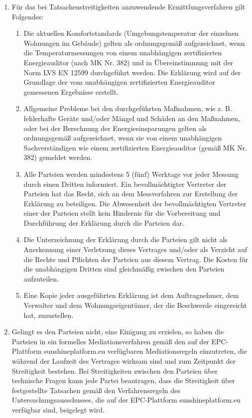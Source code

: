 \begin{multicols}{2}
\begin{enumerate}
   \item Für das bei Tatsachenstreitigkeiten anzuwendende Ermittlungsverfahren gilt Folgendes:
   \begin{enumerate}
   \item Die aktuellen Komfortstandards (Umgebungstemperatur der einzelnen Wohnungen im Gebäude) gelten als ordnungsgemäß aufgezeichnet, wenn die Temperaturmessungen von einem unabhängigen zertifizierten Energieauditor (nach MK Nr. 382) und in Übereinstimmung mit der Norm LVS EN 12599 durchgeführt werden. Die Erklärung wird auf der Grundlage der vom unabhängigen zertifizierten Energieauditor gemessenen Ergebnisse erstellt.
   \item Allgemeine Probleme bei den durchgeführten Maßnahmen, wie z. B. fehlerhafte Geräte und/oder Mängel und Schäden an den Maßnahmen, oder bei der Berechnung der Energieeinsparungen gelten als ordnungsgemäß aufgezeichnet, wenn sie von einem unabhängigen Sachverständigen wie einem zertifizierten Energieauditor (gemäß MK Nr. 382) gemeldet werden.
   \item Alle Parteien werden mindestens 5 (fünf) Werktage vor jeder Messung durch einen Dritten informiert. Ein bevollmächtigter Vertreter der Parteien hat das Recht, sich an dem Messverfahren zur Erstellung der Erklärung zu beteiligen. Die Abwesenheit der bevollmächtigten Vertreter einer der Parteien stellt kein Hindernis für die Vorbereitung und Durchführung der Erklärung durch die Parteien dar.
   \item Die Unterzeichnung der Erklärung durch die Parteien gilt nicht als Anerkennung einer Verletzung dieses Vertrages und/oder als Verzicht auf die Rechte und Pflichten der Parteien aus diesem Vertrag. Die Kosten für die unabhängigen Dritten sind gleichmäßig zwischen den Parteien aufzuteilen.
   \item Eine Kopie jeder ausgeführten Erklärung ist dem Auftragnehmer, dem Verwalter und dem Wohnungseigentümer, der die Beschwerde eingereicht hat, zuzustellen.
   \end{enumerate}
   \item Gelingt es den Parteien nicht, eine Einigung zu erzielen, so haben die Parteien in ein formelles Mediationsverfahren gemäß den auf der EPC-Plattform sunshineplatform.eu verfügbaren Mediationsregeln einzutreten, die während der Laufzeit des Vertrages wirksam sind und zum Zeitpunkt der Streitigkeit bestehen. Bei Streitigkeiten zwischen den Parteien über technische Fragen kann jede Partei beantragen, dass die Streitigkeit über festgestellte Tatsachen gemäß den Verfahrensregeln des Untersuchungsausschusses, die auf der EPC-Plattform sunshineplatform.eu verfügbar sind, beigelegt wird.

\end{enumerate}
\end{multicols}
